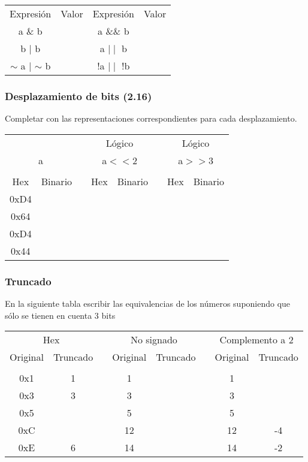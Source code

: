 \begin{tabular}{cccc}
  Expresión&Valor&Expresión&Valor\\
  a \& b&\underspace &a \&\& b &\underspace\\
  b $\mid$ b&\underspace& a $\mid\mid$ b &\underspace\\
  $\sim$ a $\mid$ $\sim$ b&\underspace& !a $\mid\mid$ !b &\underspace \\
\end{tabular}


\subsubsection{Desplazamiento de bits (2.16)}
Completar con las representaciones correspondientes para cada desplazamiento.\\

\begin{tabular}{cccccccc}
  \multicolumn{2}{c}{ }& &\multicolumn{2}{c}{Lógico}& &\multicolumn{2}{c}{Lógico}\\
  \multicolumn{2}{c}{a}& &\multicolumn{2}{c}{a$<<$2}& &\multicolumn{2}{c}{a$>>$3}\\
  \cline{1-2}\cline{4-5}\cline{7-8}\\
  Hex&Binario&&Hex&Binario&&Hex&Binario\\
  0xD4&\underspace&&\underspace &\underspace &&\underspace &\underspace\\
  0x64&\underspace&&\underspace &\underspace &&\underspace &\underspace\\
  0xD4&\underspace&&\underspace &\underspace &&\underspace &\underspace\\
  0x44&\underspace&&\underspace &\underspace &&\underspace &\underspace\\
\end{tabular}

\subsubsection{Truncado}
En la siguiente tabla escribir las equivalencias de los números suponiendo que sólo se tienen en cuenta 3 bits\\


\begin{tabular}{cccccccc}
  \multicolumn{2}{c}{Hex} & &\multicolumn{2}{c}{No signado}& &\multicolumn{2}{c}{Complemento a 2}\\
  Original&Truncado&&Original&Truncado&&Original&Truncado\\
  \cline{1-2}\cline{4-5}\cline{7-8}\\
  0x1&1          &&1  &\underspace&&1 & \underspace \\
  0x3&3          &&3  &\underspace&&3 & \underspace \\
  0x5&\underspace&&5  &\underspace&&5 & \underspace \\
  0xC&\underspace&&12 &\underspace&&12& -4\\
  0xE&6          &&14 &\underspace&&14& -2\\
\end{tabular}

